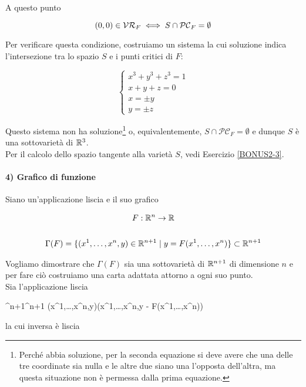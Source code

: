 A questo punto

\begin{equation}
	(0,0) \in \mathcal{VR}_{F} \iff S \cap \mathcal{PC}_{F} = \emptyset
\end{equation}

Per verificare questa condizione, costruiamo un sistema la cui soluzione indica l'intersezione tra lo spazio $ S $ e i punti critici di $ F $:

\begin{equation}
	\begin{cases}
		x^{3} + y^{3} + z^{3} = 1\\
		x+y+z=0\\
		x = \pm y\\
		y = \pm z
	\end{cases}
\end{equation}

Questo sistema non ha soluzione\footnote{%
	Perché abbia soluzione, per la seconda equazione si deve avere che una delle tre coordinate sia nulla e le altre due siano una l'opposta dell'altra, ma questa situazione non è permessa dalla prima equazione.%
} o, equivalentemente, $ S \cap \mathcal{PC}_{F} = \emptyset $ e dunque $ S $ è una sottovarietà di $ \mathbb{R}^{3} $.\\
Per il calcolo dello spazio tangente alla varietà $ S $, vedi Esercizio \ref{BONUS2-3}.

\paragraph{4) Grafico di funzione}

Siano un'applicazione liscia e il suo grafico

\begin{gather}
	F : \mathbb{R}^{n} \to \mathbb{R}\\
	\nonumber \\
	\Gamma(F) = \{ (x^{1},\dots,x^{n},y) \in \mathbb{R}^{n+1} \mid y = F(x^{1},\dots,x^{n}) \} \subset \mathbb{R}^{n+1}
\end{gather}

Vogliamo dimostrare che $ \Gamma(F) $ sia una sottovarietà di $ \mathbb{R}^{n+1} $ di dimensione $ n $ e per fare ciò costruiamo una carta adattata attorno a ogni suo punto.\\
Sia l'applicazione liscia

\map{\phi}
	{\R^{n+1}}{\R^{n+1}}
	{(x^{1},\dots,x^{n},y)}{(x^{1},\dots,x^{n},y - F(x^{1},\dots,x^{n}))}

la cui inversa è liscia

